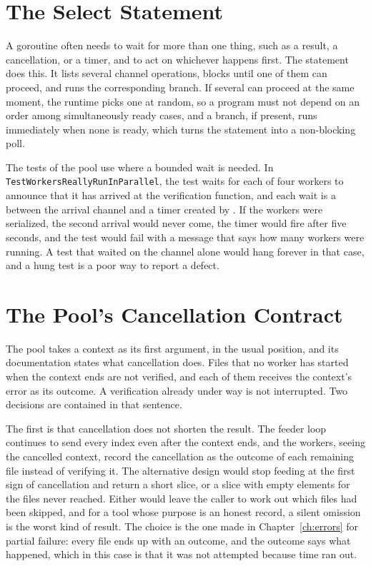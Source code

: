 \section{The Select Statement}

A goroutine often needs to wait for more than one thing, such as a result, a cancellation, or a timer, and to act on whichever happens first. The  statement does this. It lists several channel operations, blocks until one of them can proceed, and runs the corresponding branch. If several can proceed at the same moment, the runtime picks one at random, so a program must not depend on an order among simultaneously ready cases, and a  branch, if present, runs immediately when none is ready, which turns the statement into a non-blocking poll.

The tests of the pool use  where a bounded wait is needed. In \texttt{Test\-Workers\-Really\-Run\-In\-Parallel}, the test waits for each of four workers to announce that it has arrived at the verification function, and each wait is a  between the arrival channel and a timer created by . If the workers were serialized, the second arrival would never come, the timer would fire after five seconds, and the test would fail with a message that says how many workers were running. A test that waited on the channel alone would hang forever in that case, and a hung test is a poor way to report a defect.

\section{The Pool's Cancellation Contract}

The pool takes a context as its first argument, in the usual position, and its documentation states what cancellation does. Files that no worker has started when the context ends are not verified, and each of them receives the context's error as its outcome. A verification already under way is not interrupted. Two decisions are contained in that sentence.

The first is that cancellation does not shorten the result. The feeder loop continues to send every index even after the context ends, and the workers, seeing the cancelled context, record the cancellation as the outcome of each remaining file instead of verifying it. The alternative design would stop feeding at the first sign of cancellation and return a short slice, or a slice with empty elements for the files never reached. Either would leave the caller to work out which files had been skipped, and for a tool whose purpose is an honest record, a silent omission is the worst kind of result. The choice is the one made in Chapter~\ref{ch:errors} for partial failure: every file ends up with an outcome, and the outcome says what happened, which in this case is that it was not attempted because time ran out.

